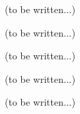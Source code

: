 


(to be written...)



(to be written...)







(to be written...)


(to be written...)



(to be written...)



\clearrightpage
\begin{appendices}
\end{appendices}

\clearrightpage
